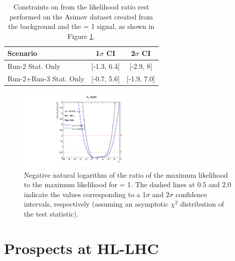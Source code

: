 \begin{table}[htbp]
    \centering
    \begin{tabular}{lcc}
    \hline\hline 
        Scenario & 1$\sigma$ CI & 2$\sigma$ CI \\
    \hline    
        Run-2 Stat. Only & [-1.3, 6.4]  & [-2.9, 8] \\
        Run-2+Run-3 Stat. Only & [-0.7, 5.6] & [-1.9, 7.0] \\
    \hline\hline 
    \end{tabular}
    \begin{tcolorbox}[colback=black!5!white, colframe=white!75!black]
    \caption{Constraints on \kl from the likelihood ratio rest performed on the Asimov dataset created from the background and the \kl= 1 signal, as shown in Figure \ref{fig:Run-3:LH}.}
    \label{tab:Run-3:kl}
    \end{tcolorbox}
\end{table}

\begin{figure}[htbp]
    \centering
    \includegraphics[width=0.5\textwidth]{Ch6/Img/likelihood_subplot_Run3.pdf}
    \begin{tcolorbox}[colback=black!5!white, colframe=white!75!black]
    \caption{Negative natural logarithm of the ratio of the maximum likelihood to the maximum likelihood for \kl= 1. The dashed lines at 0.5 and 2.0 indicate the values corresponding to a 1$\sigma$ and 2$\sigma$ confidence intervals, respectively (assuming an asymptotic $\chi^2$ distribution of the test statistic).}
    \label{fig:Run-3:LH}
    \end{tcolorbox}
\end{figure}

\section{Prospects at HL-LHC}
\label{HL-LHC:HL-LHC}

